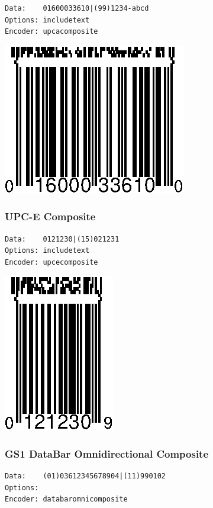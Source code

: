 \begin{verbatim}
Data:    01600033610|(99)1234-abcd
Options: includetext
Encoder: upcacomposite
\end{verbatim}

\includegraphics{images/upcacomposite-1.eps}

\hypertarget{upc-e-composite}{%
\subsubsection{UPC-E Composite}\label{upc-e-composite}}

\begin{verbatim}
Data:    0121230|(15)021231
Options: includetext
Encoder: upcecomposite
\end{verbatim}

\includegraphics{images/upcecomposite-1.eps}

\hypertarget{gs1-databar-omnidirectional-composite}{%
\subsubsection{GS1 DataBar Omnidirectional
Composite}\label{gs1-databar-omnidirectional-composite}}

\begin{verbatim}
Data:    (01)03612345678904|(11)990102
Options: 
Encoder: databaromnicomposite
\end{verbatim}

